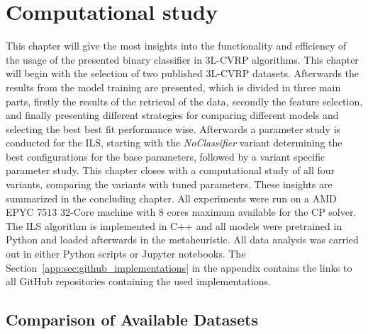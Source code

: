 \chapter{Computational study}
\label{chap:computational_study}
This chapter will give the most insights into the functionality and efficiency of the usage of the presented binary classifier in
\gls{3L-CVRP} algorithms. This chapter will begin with the selection of two published \gls{3L-CVRP} datasets.
Afterwards the results from the model training are presented, which
is divided in three main parts, firstly the results of the retrieval of the data, secondly the feature selection, and finally presenting
different strategies for comparing different models and selecting the best best fit performance wise.
Afterwards a parameter study is conducted for the \gls{ILS}, starting with the \textit{NoClassifier} variant determining
the best configurations for the base parameters, followed by a variant specific parameter study.
This chapter closes with a computational study of all four variants, comparing the variants with tuned parameters.
These insights are summarized in the concluding chapter. All experiments were run on a AMD EPYC 7513 32-Core machine
with 8 cores maximum available for the \gls{CP} solver. The \gls{ILS} algorithm is implemented in C++ and all models
were pretrained in Python and loaded afterwards in the metaheuristic. All data analysis was carried out in either Python scripts
or Jupyter notebooks. The Section~\ref{app:sec:github_implementations} in the appendix contains the links to all GitHub repositories containing the used implementations.

\section{Comparison of Available Datasets}
\label{sec:dataset_comparison}

